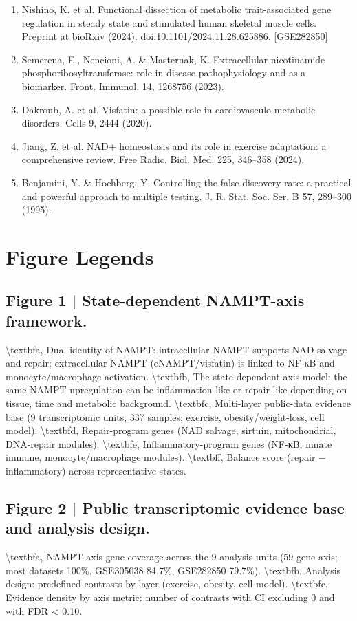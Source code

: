 \documentclass[11pt]{article}
\begin{document}
\begin{enumerate}
\item Nishino, K. et al. Functional dissection of metabolic trait-associated gene regulation in steady state and stimulated human skeletal muscle cells. Preprint at bioRxiv (2024). doi:10.1101/2024.11.28.625886. [GSE282850]
\item Semerena, E., Nencioni, A. \& Masternak, K. Extracellular nicotinamide phosphoribosyltransferase: role in disease pathophysiology and as a biomarker. Front. Immunol. 14, 1268756 (2023).
\item Dakroub, A. et al. Visfatin: a possible role in cardiovasculo-metabolic disorders. Cells 9, 2444 (2020).
\item Jiang, Z. et al. NAD+ homeostasis and its role in exercise adaptation: a comprehensive review. Free Radic. Biol. Med. 225, 346–358 (2024).
\item Benjamini, Y. \& Hochberg, Y. Controlling the false discovery rate: a practical and powerful approach to multiple testing. J. R. Stat. Soc. Ser. B 57, 289–300 (1995).
\end{enumerate}
\section*{Figure Legends}
\subsection*{Figure 1 | State-dependent NAMPT-axis framework.}
\textbackslash{}textbf{a}, Dual identity of NAMPT: intracellular NAMPT supports NAD salvage and repair; extracellular NAMPT (eNAMPT/visfatin) is linked to NF-κB and monocyte/macrophage activation. \textbackslash{}textbf{b}, The state-dependent axis model: the same NAMPT upregulation can be inflammation-like or repair-like depending on tissue, time and metabolic background. \textbackslash{}textbf{c}, Multi-layer public-data evidence base (9 transcriptomic units, 337 samples; exercise, obesity/weight-loss, cell model). \textbackslash{}textbf{d}, Repair-program genes (NAD salvage, sirtuin, mitochondrial, DNA-repair modules). \textbackslash{}textbf{e}, Inflammatory-program genes (NF-κB, innate immune, monocyte/macrophage modules). \textbackslash{}textbf{f}, Balance score (repair − inflammatory) across representative states.

\subsection*{Figure 2 | Public transcriptomic evidence base and analysis design.}
\textbackslash{}textbf{a}, NAMPT-axis gene coverage across the 9 analysis units (59-gene axis; most datasets 100\%, GSE305038 84.7\%, GSE282850 79.7\%). \textbackslash{}textbf{b}, Analysis design: predefined contrasts by layer (exercise, obesity, cell model). \textbackslash{}textbf{c}, Evidence density by axis metric: number of contrasts with CI excluding 0 and with FDR < 0.10.
\end{document}
